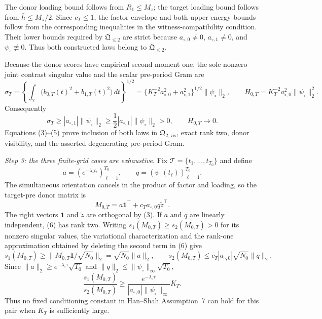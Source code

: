 The donor loading bound follows from \(R_1\le M_z\); the target loading
bound follows from \(\bar h\le M_\star/2\).  Since \(c_T\le1\), the
factor envelope and both upper energy bounds follow from the corresponding
inequalities in the witness-compatibility condition.  Their lower bounds
required by \(\mathfrak Q_{\leq2}\) are strict because
\(a_{\circ,0}\ne0\), \(a_{\circ,1}\ne0\), and
\(\psi_\circ\not\equiv0\).  Thus both constructed laws belong to
\(\mathfrak Q_{\leq2}\).

Because the donor scores have empirical second moment one, the sole
nonzero joint contrast singular value and the scalar pre-period Gram are
\[
 \sigma_T
 =\left\{\int_{\mathcal I}
       \bigl(b_{0,T}(t)^2+b_{1,T}(t)^2\bigr)\,dt\right\}^{1/2}
 =\{K_T^{-2}a_{\circ,0}^2+a_{\circ,1}^2\}^{1/2}
       \|\psi_\circ\|_2,
 \qquad
 H_{0,T}=K_T^{-2}a_{\circ,0}^2\|\psi_\circ\|_2^2.    \tag{4}
\]
Consequently
\[
 \sigma_T\ge |a_{\circ,1}|\|\psi_\circ\|_2
 \ge\frac12|a_{\circ,1}|\|\psi_\circ\|_2>0,
 \qquad H_{0,T}\longrightarrow0.                     \tag{5}
\]
Equations (3)--(5) prove inclusion of both laws in
\(\mathfrak Q_{2,\mathrm{vis}}\), exact rank two, donor visibility, and
the asserted degenerating pre-period Gram.

\emph{Step 3: the three finite-grid cases are exhaustive.}
Fix \(\mathcal T=\{t_1,\ldots,t_{T_0}\}\) and define
\[
 a=(e^{-\lambda_\circ t_\ell})_{\ell=1}^{T_0},
 \qquad q=(\psi_\circ(t_\ell))_{\ell=1}^{T_0}.
\]
The simultaneous orientation cancels in the product of factor and
loading, so the target-pre donor matrix is
\[
 M_{0,T}=a\mathbf1^\top+c_Ta_{\circ,0}q\widetilde z^\top.              \tag{6}
\]
The right vectors \(\mathbf1\) and \(\widetilde z\) are orthogonal by
(3).  If \(a\) and \(q\) are linearly independent, (6) has rank two.
Writing \(s_1(M_{0,T})\ge s_2(M_{0,T})>0\) for its nonzero singular
values, the variational characterization and the rank-one approximation
obtained by deleting the second term in (6) give
\[
 s_1(M_{0,T})
 \ge\|M_{0,T}\mathbf1/\sqrt{N_0}\|_2
 =\sqrt{N_0}\|a\|_2,
 \qquad
 s_2(M_{0,T})
 \le c_T|a_{\circ,0}|\sqrt{N_0}\|q\|_2.              \tag{7}
\]
Since
\(\|a\|_2\ge e^{-\lambda_\circ\bar\tau}\sqrt{T_0}\) and
\(\|q\|_2\le\|\psi_\circ\|_\infty\sqrt{T_0}\),
\[
 \frac{s_1(M_{0,T})}{s_2(M_{0,T})}
 \ge
 \frac{e^{-\lambda_\circ\bar\tau}}
 {|a_{\circ,0}|\|\psi_\circ\|_\infty}K_T.            \tag{8}
\]
Thus no fixed conditioning constant in Han--Shah Assumption~7 can hold
for this pair when \(K_T\) is sufficiently large.


